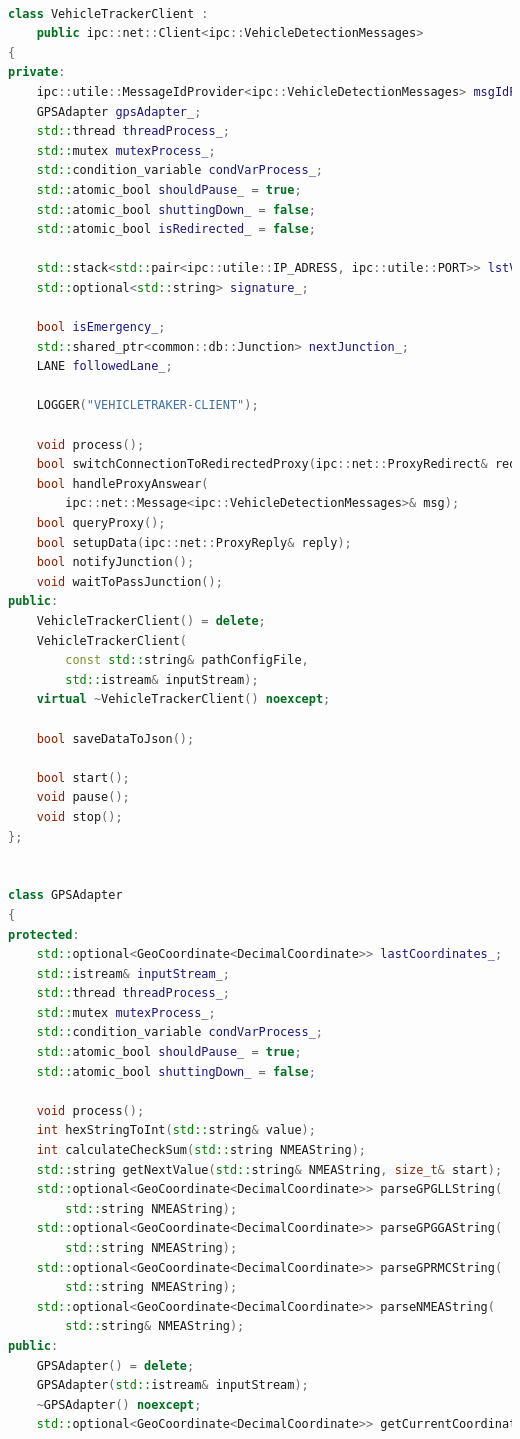 \documentclass[17pt]{article}
\begin{document}
\begin{lstlisting}[language = C++]

class VehicleTrackerClient : 
    public ipc::net::Client<ipc::VehicleDetectionMessages>
{
private:
    ipc::utile::MessageIdProvider<ipc::VehicleDetectionMessages> msgIdProvider_;
    GPSAdapter gpsAdapter_;
    std::thread threadProcess_;
    std::mutex mutexProcess_;
    std::condition_variable condVarProcess_;
    std::atomic_bool shouldPause_ = true;
    std::atomic_bool shuttingDown_ = false;
    std::atomic_bool isRedirected_ = false;

    std::stack<std::pair<ipc::utile::IP_ADRESS, ipc::utile::PORT>> lstVstedPrxys_;
    std::optional<std::string> signature_;

    bool isEmergency_;
    std::shared_ptr<common::db::Junction> nextJunction_;
    LANE followedLane_;

    LOGGER("VEHICLETRAKER-CLIENT");

    void process();
    bool switchConnectionToRedirectedProxy(ipc::net::ProxyRedirect& redirect);
    bool handleProxyAnswear(
        ipc::net::Message<ipc::VehicleDetectionMessages>& msg);
    bool queryProxy();
    bool setupData(ipc::net::ProxyReply& reply);
    bool notifyJunction();
    void waitToPassJunction();
public:
    VehicleTrackerClient() = delete;
    VehicleTrackerClient(
        const std::string& pathConfigFile,
        std::istream& inputStream);
    virtual ~VehicleTrackerClient() noexcept;

    bool saveDataToJson();

    bool start();
    void pause();
    void stop();
};


class GPSAdapter
{
protected:
	std::optional<GeoCoordinate<DecimalCoordinate>> lastCoordinates_;
	std::istream& inputStream_;
	std::thread threadProcess_;
	std::mutex mutexProcess_;
	std::condition_variable condVarProcess_;
	std::atomic_bool shouldPause_ = true;
	std::atomic_bool shuttingDown_ = false;

	void process();
	int hexStringToInt(std::string& value);
	int calculateCheckSum(std::string NMEAString);
	std::string getNextValue(std::string& NMEAString, size_t& start);
	std::optional<GeoCoordinate<DecimalCoordinate>> parseGPGLLString(
        std::string NMEAString);
	std::optional<GeoCoordinate<DecimalCoordinate>> parseGPGGAString(
        std::string NMEAString);
	std::optional<GeoCoordinate<DecimalCoordinate>> parseGPRMCString(
        std::string NMEAString);
	std::optional<GeoCoordinate<DecimalCoordinate>> parseNMEAString(
        std::string& NMEAString);
public:
	GPSAdapter() = delete;
	GPSAdapter(std::istream& inputStream);
	~GPSAdapter() noexcept;
	std::optional<GeoCoordinate<DecimalCoordinate>> getCurrentCoordinates();


\end{lstlisting}
\end{document}
